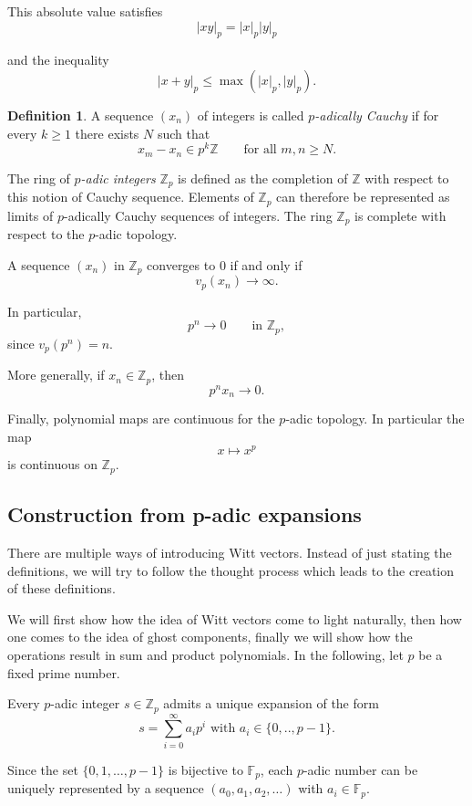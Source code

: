 \documentclass[oneside, a4paper, onecolumn, 11pt]{article}
\theoremstyle{definition}
\newtheorem{definition}{Definition}[section]
\begin{document}
This absolute value satisfies\[|xy|_p = |x|_p |y|_p\]

and the inequality \[|x+y|_p \le \max(|x|_p,|y|_p).\]

\begin{definition}
A sequence $(x_n)$ of integers is called \emph{$p$-adically Cauchy} if for every $k\ge1$ there exists $N$ such that
\[x_m-x_n \in p^k\mathbb Z\qquad\text{for all } m,n\ge N.\]
\end{definition}
The ring of \emph{$p$-adic integers} $\mathbb Z_p$ is defined as the completion of $\mathbb Z$ with respect to this notion of Cauchy sequence. Elements of $\mathbb Z_p$ can therefore be represented as limits of $p$-adically Cauchy sequences of integers.
The ring $\mathbb Z_p$ is complete with respect to the $p$-adic topology.

A sequence $(x_n)$ in $\mathbb Z_p$ converges to $0$ if and only if
\[v_p(x_n) \to \infty.\]

In particular,\[p^n \to 0\qquad\text{in } \mathbb Z_p,\] since $v_p(p^n)=n$.

More generally, if $x_n\in\mathbb Z_p$, then \[p^n x_n \to 0.\]

Finally, polynomial maps are continuous for the $p$-adic topology. In particular the map \[x \mapsto x^p\] is continuous on $\mathbb Z_p$.

\subsection{Construction from p-adic expansions}

There are multiple ways of introducing Witt vectors. Instead of just stating the definitions, we will try to follow the thought process which leads to the creation of these definitions. 

We will first show how the idea of Witt vectors come to light naturally, then how one comes to the idea of ghost components, finally we will show how the operations result in sum and product polynomials.
\newline
\newline
In the following, let $p$ be a fixed prime number. 

Every $p$-adic integer $s \in \mathbb{Z}_p$ admits a unique expansion of the form \[s=\sum_{i=0}^{\infty}a_ip^i \text{  with  } a_i\in\{0,..,p-1\}.\]

Since the set $\{0,1,\ldots,p-1\}$ is bijective to $\mathbb{F}_p$, each $p$-adic number can be uniquely represented by a sequence $(a_0,a_1,a_2,\ldots)$ with $a_i \in \mathbb{F}_p$.
\end{document}
